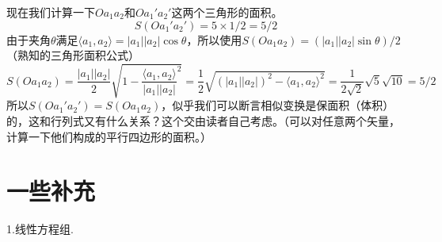 \documentclass[11pt,a4paper,openany]{book}%
\theoremstyle{plain}%
\begin{document}
现在我们计算一下$Oa_1a_2$和$Oa_1'a_2'$这两个三角形的面积。
\[
S(Oa_1'a_2')=5\times1/2=5/2
\]
由于夹角$\theta$满足$\langle a_1,a_2 \rangle=|a_1||a_2|\cos\theta$，所以使用$S(Oa_1a_2)=(|a_1||a_2|\sin\theta)/2$（熟知的三角形面积公式）
\[
S(Oa_1a_2)=\frac{|a_1||a_2|}{2}\sqrt{1-\frac{\langle a_1,a_2 \rangle}{|a_1||a_2|}^2}=\frac{1}{2}\sqrt{(|a_1||a_2|)^2-\langle a_1,a_2 \rangle^2}=\frac{1}{2\sqrt{2}}\sqrt{5}\sqrt{10}=5/2
\]
所以$S(Oa_1'a_2')=S(Oa_1a_2)$，似乎我们可以断言相似变换是保面积（体积）的，这和行列式又有什么关系？这个交由读者自己考虑。（可以对任意两个矢量，计算一下他们构成的平行四边形的面积。）

\section{一些补充}
\noindent 1.线性方程组.
\end{document}
